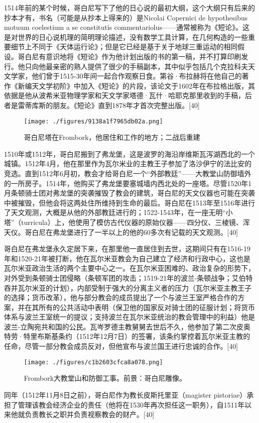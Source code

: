 1514年前的某个时候，哥白尼写下了他的日心说的最初大纲，这个大纲只有后来的抄本才有，书名（可能是从抄本上得来的）是Nicolai Copernici de hypothesibus motuum coelestium a se constitutis commentariolus——通常被称为《短论》。这是对世界的日心说机理的简明理论描述，没有数学工具计算，在几何构造的一些重要细节上不同于《天体运行论》；但是它已经是基于关于地球三重运动的相同假设。哥白尼有意识地将《短论》作为他计划出版的书的第一稿，并不打算印刷发行。他只向他最亲密的熟人提供了很少的手稿副本，其中似乎包括几个克拉科夫天文学家，他们曾于1515-30年间一起合作观察日食。第谷·布拉赫将在他自己的著作《新编天文学初阶》中加入《短论》的片段，该论文于1602年在布拉格出版，其依据是他从波希米亚物理学家和天文学家塔德·瓦什·哈耶克那里收到的手稿，后者是雷蒂库斯的朋友。《短论》直到1878年才首次完整出版。[40]
\begin{figure}[ht]
\centering
\texttt{[image: ./figures/9138a1f7965db02a.png]}
\caption{哥白尼塔在Frombork，他居住和工作的地方；二战后重建} \label{fig_GBN_12}
\end{figure}
1510年或1512年，哥白尼搬到了弗龙堡，这是波罗的海沿岸维斯瓦泻湖西北的一个城镇。1512年4月，他在那里作为瓦尔米业的主教王子参加了洛沙伊宁的法比安的竞选。直到1512年6月初，教会才给哥白尼一个“外部教廷”——大教堂山防御墙外的一所房子。1514年，他购买了弗龙堡要塞城墙内西北处的一座塔。尽管1520年1月条顿骑士团对弗龙堡的突袭摧毁了教会的建筑，哥白尼的天文仪器也可能在突袭中被摧毁，但他会将这两处住所维持到生命的最后。哥白尼在1513年至1516年进行了天文观测，大概是从他的外部教廷进行的；1522-1543年，在一座无明“小塔”（turricula）上，他使用了模仿古代仪器的原始仪器——四分仪、三棱镜、浑天仪。哥白尼在弗龙堡进行了一半以上的他的60多次有记载的天文观测。[40]

哥白尼在弗龙堡永久定居下来，在那里他一直居住到去世，这期间只有在1516-19年和1520-21年被打断，他在瓦尔米亚教会为自己建立了经济和行政中心，这也是瓦尔米亚政治生活的两个主要中心之一。在瓦尔米亚困难的、政治复杂的形势下，对外受到条顿骑士团侵略（条顿军团的攻击；1519-21年的波兰-条顿战争；艾伯特吞并瓦尔米亚的计划），内部受制于强大的分离主义者的压力（瓦尔米亚主教王子的选择；货币改革），他与部分教会的成员提出了一个与波兰王室严格合作的方案，并在其所有的公共活动中表明（保卫他的国家反对骑士团的征服计划；将货币体系与波兰王室统一的提议；支持波兰在瓦尔米亚统治的教会管理中的利益）他是波兰-立陶宛共和国的公民。瓦岑罗德主教舅舅去世后不久，他参加了第二次皮奥特劳·特里布斯基条约（1512年12月7日）的签署，该条约掌控着瓦尔米亚主教的任命，尽管一部分教会成员反对，但他宣布与波兰国王进行忠诚的合作。[40]
\begin{figure}[ht]
\centering
\texttt{[image: ./figures/c1b2603cfca8a078.png]}
\caption{Frombork大教堂山和防御工事。前景：哥白尼雕像。} \label{fig_GBN_13}
\end{figure}
同年（1512年11月8日之前），哥白尼作为教长皮斯托里亚（magister pistoriae）承担了管理该教会经济企业的责任（他将在1530年再次担任这一职务），自1511年以来他就负责教长之职并负责视察教会的财产。[40]


